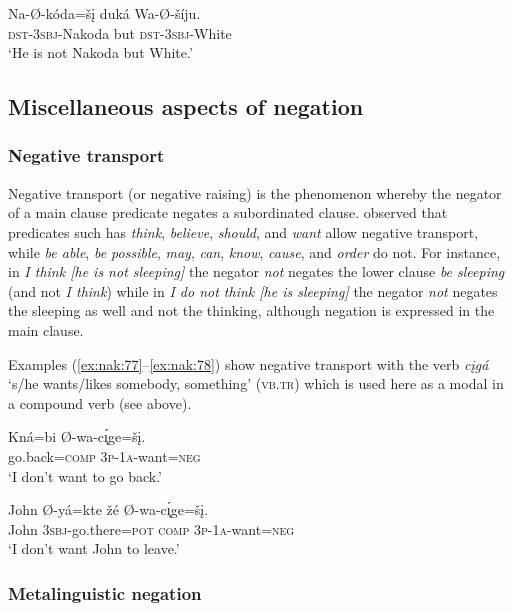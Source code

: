 \documentclass[output=paper,colorlinks,citecolor=brown]{langscibook}
\begin{document}
\ea\label{ex:nak:76}
    \gll Na-Ø-kóda=šį duká Wa-Ø-šíju. \\
         \textsc{dst-3sbj}-Nakoda but \textsc{dst-3sbj}-White\\
    \glt ‘He is not Nakoda but White.’
\z 

\subsection{Miscellaneous aspects of negation}\label{sec:nak:4.5}
\subsubsection{Negative transport}\label{sec:nak:4.5.1}

Negative transport (or negative raising) is the phenomenon whereby the negator of a main clause predicate negates a subordinated clause. \citet{Horn1978} observed that predicates such has \textit{think}, \textit{believe}, \textit{should}, and \textit{want} allow negative transport, while \textit{be able}, \textit{be possible}, \textit{may}, \textit{can}, \textit{know}, \textit{cause}, and \textit{order} do not. For instance, in \textit{I think [he is not sleeping]} the negator \textit{not} negates the lower clause \textit{be sleeping} (and not \textit{I think}) while in \textit{I do not think [he is sleeping]} the negator \textit{not} negates the sleeping as well and not the thinking, although negation is expressed in the main clause. 

Examples (\ref{ex:nak:77}--\ref{ex:nak:78}) show negative transport with the verb \textit{cįgá} ‘s/he wants/likes somebody, something’ (\textsc{vb.tr})
which is used here as a modal in a compound verb (see  above). 

\ea\label{ex:nak:77}
    \gll Kná=bi Ø-wa-c\'{\k{ı}}ge=šį. \\
         go.back=\textsc{comp} \textsc{3p-1a}-want=\textsc{neg} \\
    \glt ‘I don’t want to go back.’
\z

\ea\label{ex:nak:78}
    \gll John Ø-yá=kte žé Ø-wa-c\'{\k{ı}}ge=šį. \\
         John \textsc{3sbj}-go.there=\textsc{pot} \textsc{comp} \textsc{3p-1a}-want=\textsc{neg} \\
    \glt ‘I don’t want John to leave.’
\z

\subsubsection{Metalinguistic negation}\label{sec:nak:4.5.2}
\end{document}
